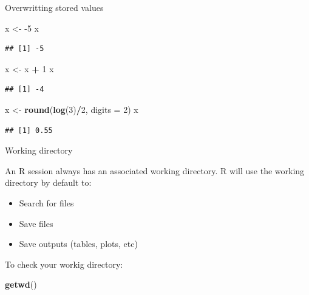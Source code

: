 \documentclass[ignorenonframetext,]{beamer}
\newenvironment{Shaded}{\begin{snugshade}}{\end{snugshade}}
\newcommand{\DataTypeTok}[1]{\textcolor[rgb]{0.13,0.29,0.53}{#1}}
\newcommand{\DecValTok}[1]{\textcolor[rgb]{0.00,0.00,0.81}{#1}}
\newcommand{\KeywordTok}[1]{\textcolor[rgb]{0.13,0.29,0.53}{\textbf{#1}}}
\newcommand{\NormalTok}[1]{#1}
\newcommand{\OperatorTok}[1]{\textcolor[rgb]{0.81,0.36,0.00}{\textbf{#1}}}
\newcommand{\StringTok}[1]{\textcolor[rgb]{0.31,0.60,0.02}{#1}}
\begin{document}
\begin{frame}[fragile]{Overwritting stored values}
\protect\hypertarget{overwritting-stored-values}{}

\begin{Shaded}
\begin{Highlighting}[]
\NormalTok{x <-}\StringTok{ }\DecValTok{-5}
\NormalTok{x}
\end{Highlighting}
\end{Shaded}

\begin{verbatim}
## [1] -5
\end{verbatim}

\begin{Shaded}
\begin{Highlighting}[]
\NormalTok{x <-}\StringTok{ }\NormalTok{x }\OperatorTok{+}\StringTok{ }\DecValTok{1} 
\NormalTok{x}
\end{Highlighting}
\end{Shaded}

\begin{verbatim}
## [1] -4
\end{verbatim}

\begin{Shaded}
\begin{Highlighting}[]
\NormalTok{x <-}\StringTok{ }\KeywordTok{round}\NormalTok{(}\KeywordTok{log}\NormalTok{(}\DecValTok{3}\NormalTok{)}\OperatorTok{/}\DecValTok{2}\NormalTok{, }\DataTypeTok{digits =} \DecValTok{2}\NormalTok{)}
\NormalTok{x}
\end{Highlighting}
\end{Shaded}

\begin{verbatim}
## [1] 0.55
\end{verbatim}

\end{frame}

\begin{frame}[fragile]{Working directory}
\protect\hypertarget{working-directory}{}

An R session always has an associated working directory. R will use the
working directory by default to:

\begin{itemize}
\item
  Search for files
\item
  Save files
\item
  Save outputs (tables, plots, etc)
\end{itemize}

To check your workig directory:

\begin{Shaded}
\begin{Highlighting}[]
\KeywordTok{getwd}\NormalTok{()}
\end{Highlighting}
\end{Shaded}

\end{frame}
\end{document}
